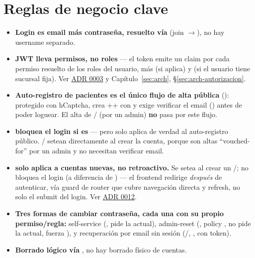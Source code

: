 \section{Reglas de negocio clave}
\label{sec:identidad-reglas}

\begin{itemize}
  \item \textbf{Login es email más contraseña, resuelto vía } (join $\to$), no hay username separado.
  \item \textbf{JWT lleva permisos, no roles} --- el token emite un claim  por cada permiso resuelto de los roles del usuario, más  (si aplica) y  (si el usuario tiene sucursal fija). Ver \hyperref[adr:0003]{ADR 0003} y Capítulo~\ref{sec:arch}, \S\ref{sec:arch-autorizacion}.
  \item \textbf{Auto-registro de pacientes es el único flujo de alta pública} (\allowbreak {}): protegido con hCaptcha, crea ++ con \allowbreak {}\allowbreak {} y exige verificar el email () antes de poder loguear. El alta de / (por un admin) \textbf{no} pasa por este flujo.
  \item \textbf{\allowbreak {}\allowbreak {} bloquea el login si es } --- pero solo aplica de verdad al auto-registro público. \allowbreak {}/\allowbreak {} setean \allowbreak {}\allowbreak {} directamente al crear la cuenta, porque son altas ``vouched-for'' por un admin y no necesitan verificar email.
  \item \textbf{\allowbreak {}\allowbreak {} solo aplica a cuentas nuevas, no retroactivo.} Se setea  al crear un /; no bloquea el login (a diferencia de ) --- el frontend redirige \emph{después} de autenticar, vía guard de router que cubre navegación directa y refresh, no solo el submit del login. Ver \hyperref[adr:0012]{ADR 0012}.
  \item \textbf{Tres formas de cambiar contraseña, cada una con su propio permiso/regla:} self-service (, pide la actual), admin-reset (, policy , no pide la actual, fuerza \allowbreak {}\allowbreak {}), y recuperación por email sin sesión (/, , con token).
  \item \textbf{Borrado lógico vía \allowbreak {}}, no hay borrado físico de cuentas.
\end{itemize}

